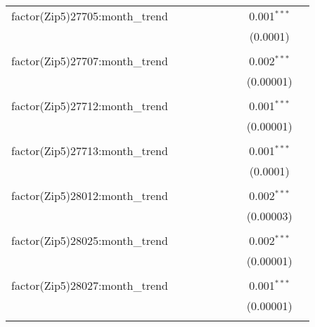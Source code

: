 \begin{table}[H]
{\begin{tabular}{@{\extracolsep{5pt}}lcccccccc}
  factor(Zip5)27705:month\_trend &  &  &  &  &  &  & 0.001$^{***}$ &  \\  

   &  &  &  &  &  &  & (0.0001) &  \\  

   & & & & & & & & \\  

  factor(Zip5)27707:month\_trend &  &  &  &  &  &  & 0.002$^{***}$ &  \\  

   &  &  &  &  &  &  & (0.00001) &  \\  

   & & & & & & & & \\  

  factor(Zip5)27712:month\_trend &  &  &  &  &  &  & 0.001$^{***}$ &  \\  

   &  &  &  &  &  &  & (0.00001) &  \\  

   & & & & & & & & \\  

  factor(Zip5)27713:month\_trend &  &  &  &  &  &  & 0.001$^{***}$ &  \\  

   &  &  &  &  &  &  & (0.0001) &  \\  

   & & & & & & & & \\  

  factor(Zip5)28012:month\_trend &  &  &  &  &  &  & 0.002$^{***}$ &  \\  

   &  &  &  &  &  &  & (0.00003) &  \\  

   & & & & & & & & \\  

  factor(Zip5)28025:month\_trend &  &  &  &  &  &  & 0.002$^{***}$ &  \\  

   &  &  &  &  &  &  & (0.00001) &  \\  

   & & & & & & & & \\  

  factor(Zip5)28027:month\_trend &  &  &  &  &  &  & 0.001$^{***}$ &  \\  

   &  &  &  &  &  &  & (0.00001) &  \\  

   & & & & & & & & \\  


\end{tabular}}
\end{table}
